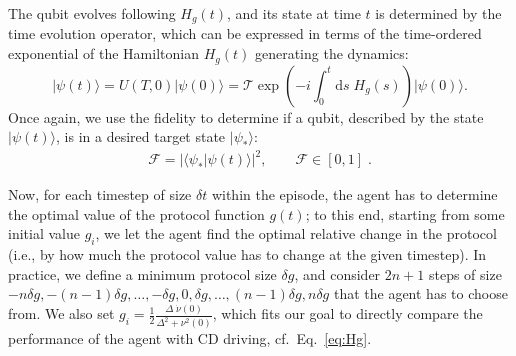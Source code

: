 The qubit evolves following $H_g(t)$, and its state at time $t$ is determined by the time evolution operator, which can be expressed in terms of the time-ordered exponential of the Hamiltonian $H_g(t)$ generating the dynamics:
\begin{equation}
    |\psi(t)\rangle =U(T,0)|\psi(0)\rangle = \mathcal{T}\exp\left(-i \int^t_0\mathrm ds\;  H_g(s)\right)|\psi(0)\rangle .
\end{equation}
Once again, we use the fidelity to determine if a qubit, described by the state $|\psi(t)\rangle$, is in a desired target state $|\psi_\ast\rangle$:
\begin{eqnarray}
    \mathcal F=|\langle\psi_\ast|\psi(t)\rangle|^2 ,\qquad \mathcal F\in[0,1]\; .
\end{eqnarray}


Now, for each timestep of size $\delta t$ within the episode, the agent has to determine the optimal value of the protocol function $g(t)$; to this end, starting from some initial value $g_i$, we let the agent find the optimal relative change in the protocol (i.e., by how much the protocol value has to change at the given timestep). In practice, we define a minimum protocol size $\delta g$, and consider $2n+1$ steps of size $-n\delta g, -(n-1)\delta g, \dots, -\delta g, 0,\delta g,\dots, (n-1)\delta g, n\delta g$ that the agent has to choose from. We also set $g_i=\frac{1}{2}\frac{\Delta\; \dot\nu(0)}{\Delta^2 + \nu^2(0)}$, which fits our goal to directly compare the performance of the agent with CD driving, cf.~Eq.~\eqref{eq:Hg}.   



